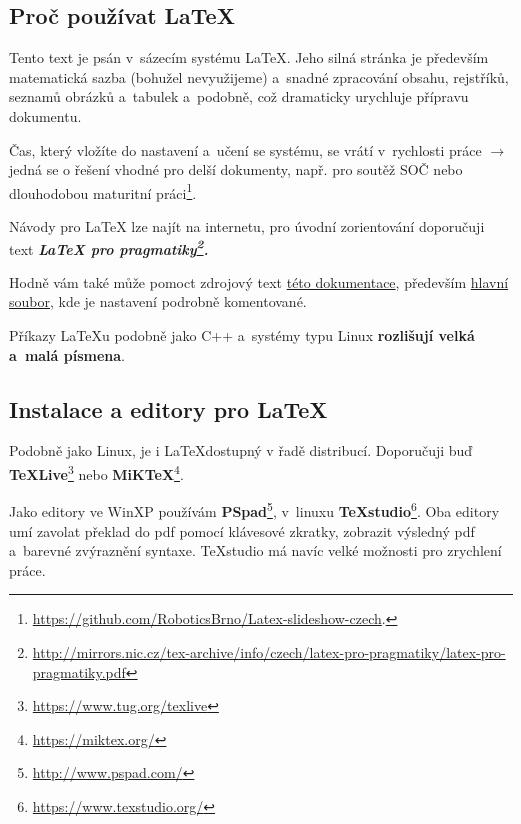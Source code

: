 \subsection{Proč používat \LaTeX} 

Tento text je psán v~sázecím systému  \LaTeX . 
Jeho silná stránka je především matematická sazba 
(bohužel nevyužijeme) a~snadné zpracování obsahu, rejstříků, seznamů obrázků a~tabulek a~podobně, což dramaticky urychluje přípravu dokumentu. 

Čas, který vložíte do nastavení a~učení se systému, se vrátí v~rychlosti práce
 $\rightarrow$ jedná se o řešení vhodné pro delší dokumenty, např. pro soutěž SOČ nebo dlouhodobou maturitní práci\footnote{\url{https://github.com/RoboticsBrno/Latex-slideshow-czech}.}. 
 
Návody pro \LaTeX{}  lze najít na internetu,  pro úvodní zorientování 
 doporučuji text  \bfseries \itshape  \LaTeX{} pro pragmatiky\footnote{\url{http://mirrors.nic.cz/tex-archive/info/czech/latex-pro-pragmatiky/latex-pro-pragmatiky.pdf} }\upshape \mdseries .

Hodně vám také může pomoct zdrojový text \href{https://github.com/RoboticsBrno/RoboticsBrno-guides/tree/RoboticsManual/RoboticsManual}{této dokumentace}, 
 především
 \href{https://github.com/RoboticsBrno/RoboticsBrno-guides/blob/RoboticsManual/RoboticsManual/_dokumentace.tex}{hlavní soubor},
 kde je nastavení podrobně komentované.  

Příkazy \LaTeX{}u podobně jako C++ a~systémy typu Linux {\bf rozlišují velká a~malá písmena}. 
 

\subsection{Instalace a editory pro \LaTeX}


Podobně jako Linux, je i \LaTeX dostupný v řadě distribucí. Doporučuji buď 
{\bf TeXLive}\footnote{\url{https://www.tug.org/texlive}} 
 nebo {\bf MiKTeX}\footnote{\url{https://miktex.org/}}.  
{\bf }

Jako editory ve WinXP používám {\bf PSpad}\footnote{\url{http://www.pspad.com/}}, v~linuxu {\bf TeXstudio}\footnote{\url{https://www.texstudio.org/}}.  
Oba editory umí zavolat překlad do pdf pomocí klávesové zkratky, zobrazit výsledný pdf a~barevné zvýraznění syntaxe. TeXstudio má navíc velké možnosti pro zrychlení práce.  



